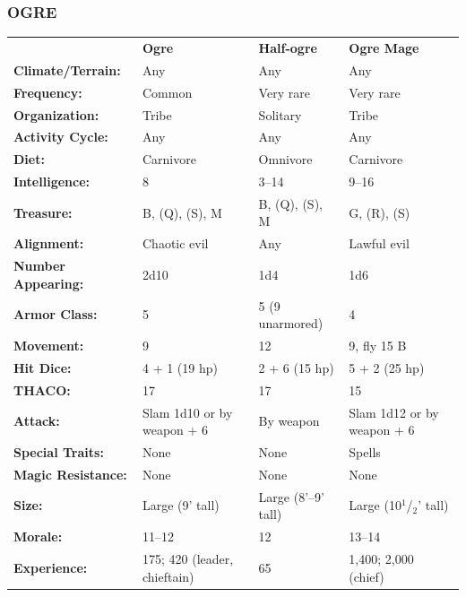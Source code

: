 \noindent
\begin{minipage}{\columnwidth}

\vspace{1em}

\subsubsection{OGRE}

\noindent \begin{tabular}{p{}g{.23\columnwidth}p{.23\columnwidth}g{.23\columnwidth}}
	& \textbf{Ogre}	& \textbf{Half-ogre}	& \textbf{Ogre Mage}	\\
\textbf{Climate/Terrain:}	& Any	& Any	& Any	\\
\textbf{Frequency:} 		& Common	& Very rare	& Very rare	\\
\textbf{Organization:} 		& Tribe	& Solitary	& Tribe	\\
\textbf{Activity Cycle:} 	& Any	& Any	& Any	\\
\textbf{Diet:} 				& Carnivore	& Omnivore	& Carnivore	\\
\textbf{Intelligence:} 		& 8	& 3--14	& 9--16	\\
\textbf{Treasure:} 			& B, (Q), (S), M	& B, (Q), (S), M	& G, (R), (S)	\\
\textbf{Alignment:} 		& Chaotic evil	& Any	& Lawful evil	\\
\hline
\textbf{Number Appearing:} 	& 2d10	& 1d4	& 1d6	\\
\textbf{Armor Class:} 		& 5	& 5 (9 unarmored)	& 4	\\
\textbf{Movement:} 			& 9	& 12	& 9, fly 15 B	\\
\textbf{Hit Dice:} 			& 4 + 1 (19 hp)	& 2 + 6 (15 hp)	& 5 + 2 (25 hp)	\\
\textbf{THACO:} 			& 17	& 17	& 15	\\
\textbf{Attack:} 			& Slam 1d10 or by weapon + 6	& By weapon	& Slam 1d12 or by weapon + 6	\\
\textbf{Special Traits:} & None	& None	& Spells	\\
\textbf{Magic Resistance:} 	& None	& None	& None	\\
\textbf{Size:} 				& Large (9' tall)	& Large (8'--9'	tall)	& Large (10$^1$/$_2$' tall)	\\
\textbf{Morale:} 			& 11--12	& 12	& 13--14	\\
\textbf{Experience:} 		& 175; 420 (leader, chieftain)	& 65	& 1,400; 2,000 (chief)	\\ %
\end{tabular}

\end{minipage}

